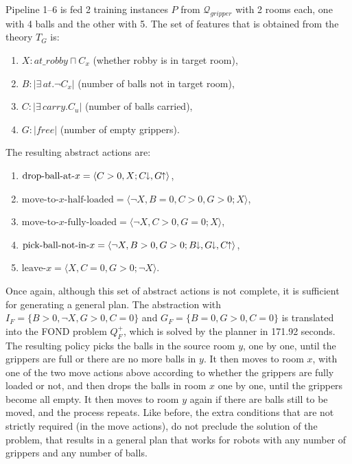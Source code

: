 \documentclass[letterpaper]{article} %
\newcommand{\tup}[1]{\langle #1 \rangle}
\newcommand{\abs}[1]{\ensuremath{\left\vert{#1}\right\vert}}
\newcommand{\Q}{\mathcal{Q}}
\newcommand{\abst}[2]{\tup{#1;#2}}
\newcommand{\pplus}{\hspace{-.05em}\raisebox{.15ex}{\footnotesize$\uparrow$}}
\newcommand{\mminus}{\hspace{-.05em}\raisebox{.15ex}{\footnotesize$\downarrow$}}
\begin{document}
Pipeline 1--6 is fed  2 training instances $P$ from $\Q_{gripper}$  with 2
rooms each, one with 4 balls and the other with 5. The set of features that
is obtained from the theory $T_G$ is:
\begin{enumerate}[--]
  \item $X: at\_robby \sqcap C_x$ (whether robby is in target room),
  \item $B: |\exists\,at . \neg C_x|$ (number of balls not in target room),
  \item $C: |\exists\,carry . C_u|$ (number of balls carried),
  \item $G: \abs{free}$ (number of empty grippers).
\end{enumerate}

\noindent The resulting abstract actions are:

\begin{enumerate}[--]
  \item $\text{drop-ball-at-$x$}=\abst{C>0, X}{C\mminus, G \pplus}$,
  \item $\text{move-to-$x$-half-loaded}\! =\!  \abst{\neg X, B=0, C>0, G\!>\!0}{X}$,
  \item $\text{move-to-$x$-fully-loaded} = \abst{\neg X, C>0, G=0}{X}$,
  \item $\text{pick-ball-not-in-$x$} = \abst{\neg X, B > 0, G > 0}{B\mminus, G\mminus, C\pplus}$,
  \item $\text{leave-$x$} = \abst{X, C=0, G > 0}{\neg X}$.
\end{enumerate}

Once again, although this set of abstract actions  is not complete,
it is sufficient for generating a general plan. The abstraction with
$I_F = \{ B>0, \neg X, G>0, C=0\}$ and $G_F = \{ B=0, G>0, C=0 \}$ is
translated into the FOND problem $Q^+_F$, which is solved by the
planner in 171.92 seconds. 
The resulting policy picks the balls in the source room $y$, one by one, 
until the grippers are full or there are no more balls in $y$.
It then moves to room $x$, with one of the two move actions above
according to whether the grippers are fully loaded or not,
and then drops the balls in room $x$ one by one, until the grippers
become all empty. It then moves to room $y$ again if there are balls
still to be moved, and the process repeats. Like before, the extra conditions
that are not strictly required (in the move actions), do not preclude
the solution of the problem, that results in a general plan that 
works  for robots with any  number of grippers and  any number of balls. 
\end{document}

